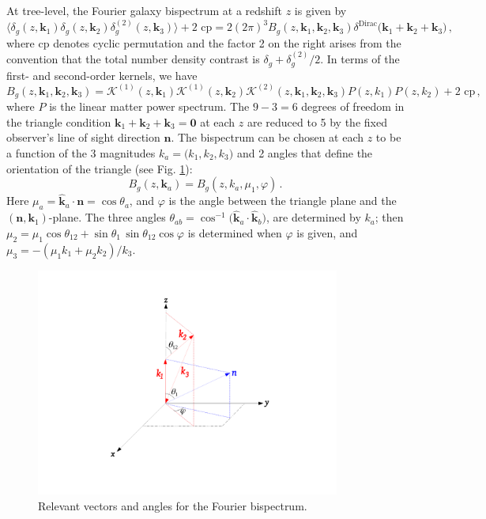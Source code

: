 At tree-level, the Fourier galaxy bispectrum at a redshift $z$ is given by
\begin{equation}
{\big\langle \delta_g(z,\bm{k}_{1})\delta_g(z,\bm{k}_{2})\delta^{(2)}_g(z,\bm{k}_{3}) \big\rangle + \text{2 cp}=2 (2\pi)^3 B_{g}(z, \bm{k}_{1}, \bm{k}_{2}, \bm{k}_{3}) \delta^{\mathrm{Dirac}}\big(\bm{k}_{1}+ \bm{k}_{2}+ \bm{k}_{3} \big)\,,}
\end{equation}
where cp denotes cyclic permutation and the factor 2 on the right arises from the convention that the total number density contrast is $\delta_g+ \delta^{(2)}_g/2$.  
In terms of the first- and second-order kernels, we have
\begin{equation}
B_{g}(z, \bm{k}_{1}, \bm{k}_{2}, \bm{k}_{3}) = \mathcal{K}^{(1)}(z, \bm{k}_{1})\mathcal{K}^{(1)}(z, \bm{k}_{2})\mathcal{K}^{(2)}(z, \bm{k}_{1}, \bm{k}_{2}, \bm{k}_{3})P(z, k_{1})P(z, k_{2}) + \text{2 cp}\,, \label{eq:bkern}
\end{equation}
where $P$ is the linear matter power spectrum. 
The $9-3=6$ degrees of freedom in the triangle condition $\bm{k}_{1}+ \bm{k}_{2}+ \bm{k}_{3}=\bm{0}$ at each $z$ are reduced to 5 by the fixed observer's line of sight direction $\bm{n}$.
The bispectrum can be chosen at each $z$ to be a function  of the 3 magnitudes ${k_a}=\big({k}_{1}, {k}_{2},{k}_{3}\big)$ and 2 angles that define the orientation of the triangle (see Fig. \ref{fig0}):
\begin{equation}
B_{g}(z, \bm{k}_{a}) =B_{g}(z, {k}_{a},  \mu_1,\varphi) \,.
\end{equation}
Here $\mu_a=\hat{\bm{k}}_a\cdot\bm{n}=\cos\theta_a$,  and $\varphi$ is the angle between the triangle plane and the $(\bm{n},\bm{k}_1)$-plane. The three angles $\theta_{ab}= \cos^{-1}\big(\hat{\bm{k}}_{a} \cdot \hat{\bm{k}}_b\big)$, are determined by $k_a$; then $\mu_2=\mu_1\cos\theta_{12}+ \sin\theta_1\,\sin\theta_{12}\cos\varphi$ is determined when $\varphi$ is given, and $\mu_3=-(\mu_1k_1+\mu_2k_2)/k_3$.
\begin{figure}[ht]
\centering
\includegraphics[width=10.0cm]{fig/geometryAngles}
\vspace*{-1cm}
\caption{Relevant vectors and angles for the Fourier bispectrum.} \label{fig0}
\end{figure}

